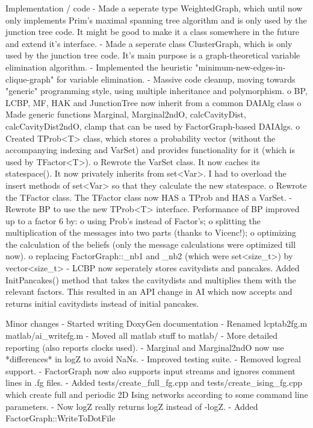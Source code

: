 \begin{DoxyVerbInclude}
Implementation / code
- Made a seperate type WeightedGraph, which until now only implements Prim's
  maximal spanning tree algorithm and is only used by the junction tree code. It might
  be good to make it a class somewhere in the future and extend it's interface.
- Made a seperate class ClusterGraph, which is only used by the junction tree
  code. It's main purpose is a graph-theoretical variable elimination algorithm.
- Implemented the heuristic "minimum-new-edges-in-clique-graph" for variable elimination.
- Massive code cleanup, moving towards "generic" programming style, using
  multiple inheritance and polymorphism.
  o BP, LCBP, MF, HAK and JunctionTree now inherit from a common DAIAlg class
  o Made generic functions Marginal, Marginal2ndO, calcCavityDist, calcCavityDist2ndO, clamp
    that can be used by FactorGraph-based DAIAlgs.
  o Created TProb<T> class, which stores a probability vector (without the accompanying indexing
    and VarSet) and provides functionality for it (which is used by TFactor<T>).
  o Rewrote the VarSet class. It now caches its statespace(). It now privately inherits from set<Var>.
    I had to overload the insert methods of set<Var> so that they calculate the new statespace.
  o Rewrote the TFactor class. The TFactor class now HAS a TProb and HAS a VarSet.
- Rewrote BP to use the new TProb<T> interface. Performance of BP improved up to a factor 6 by:
  o using Prob's instead of Factor's;
  o splitting the multiplication of the messages into two parts (thanks to Vicenc!);
  o optimizing the calculation of the beliefs (only the message calculations were optimized till now).
  o replacing FactorGraph::_nb1 and _nb2 (which were set<size_t>) by vector<size_t>
- LCBP now seperately stores cavitydists and pancakes. Added InitPancakes() method
  that takes the cavitydists and multiplies them with the relevant factors. This
  resulted in an API change in AI which now accepts and returns initial cavitydists
  instead of initial pancakes.

Minor changes
- Started writing DoxyGen documentation
- Renamed lcptab2fg.m matlab/ai_writefg.m
- Moved all matlab stuff to matlab/
- More detailed reporting (also reports clocks used).
- Marginal and Marginal2ndO now use *differences* in logZ to avoid NaNs.
- Improved testing suite.
- Removed logreal support.
- FactorGraph now also supports input streams and ignores comment lines in .fg files.
- Added tests/create_full_fg.cpp and tests/create_ising_fg.cpp which create
  full and periodic 2D Ising networks according to some command line parameters.
- Now logZ really returns logZ instead of -logZ.
- Added FactorGraph::WriteToDotFile



\end{DoxyVerbInclude}
